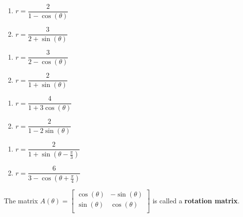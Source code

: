 \begin{multicols}{2}

\begin{enumerate}
\setcounter{enumi}{\value{HW}}
\item  $r = \dfrac{2}{1-\cos(\theta)}$

\item  $r = \dfrac{3}{2 + \sin(\theta)}$
\setcounter{HW}{\value{enumi}}
\end{enumerate}
\end{multicols}

\begin{multicols}{2}

\begin{enumerate}
\setcounter{enumi}{\value{HW}}
\item  $r = \dfrac{3}{2-\cos(\theta)}$

\item  $r = \dfrac{2}{1 + \sin(\theta)}$
\setcounter{HW}{\value{enumi}}
\end{enumerate}
\end{multicols}

\begin{multicols}{2}

\begin{enumerate}
\setcounter{enumi}{\value{HW}}

\item   $r = \dfrac{4}{1+3\cos(\theta)}$

\item  $r = \dfrac{2}{1-2\sin(\theta)}$

\setcounter{HW}{\value{enumi}}
\end{enumerate}
\end{multicols}

\begin{multicols}{2}

\begin{enumerate}
\setcounter{enumi}{\value{HW}}
\item  $r = \dfrac{2}{1 + \sin(\theta - \frac{\pi}{3})}$

\item  $r = \dfrac{6}{3 - \cos\left(\theta + \frac{\pi}{4}\right)}$
\setcounter{HW}{\value{enumi}}
\end{enumerate}
\end{multicols}


 The matrix $A(\theta) = \left[ \begin{array}{rr} \cos(\theta) & -\sin(\theta) \\ \sin(\theta) & \cos(\theta) \\ \end{array} \right]$  is called a \textbf{rotation matrix}. 
 
